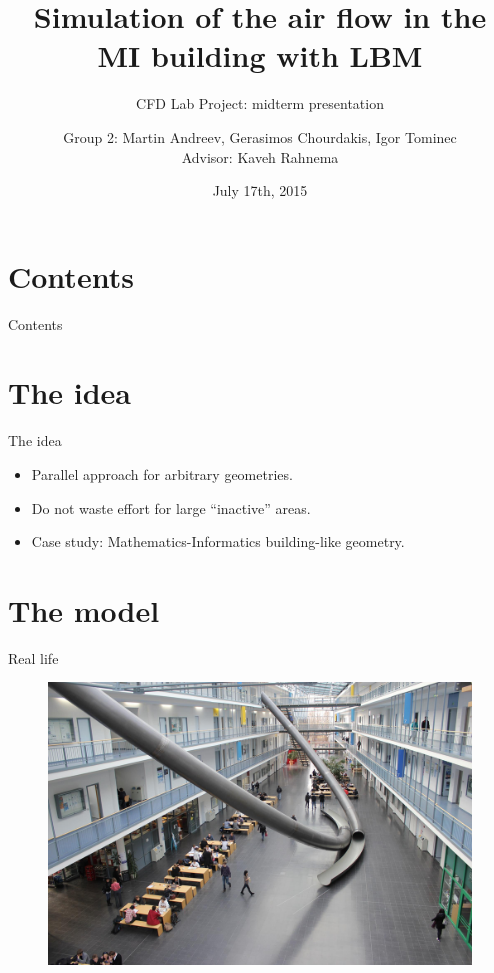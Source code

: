 \documentclass[9pt,pdftex]{beamer}
\title{Simulation of the air flow in the MI building with LBM}
\subtitle{CFD Lab Project: midterm presentation}
\author[Group 2]{Group 2: Martin Andreev, Gerasimos Chourdakis, Igor Tominec \\ Advisor: Kaveh Rahnema} %
\date{July 17th, 2015}
\institute{Technische Universität München}
\begin{document}
	\frame{\titlepage}

\section*{Contents}
\begin{frame}{Contents}
\tableofcontents
\end{frame}
	

\section{The idea}
\begin{frame}{The idea}
 \begin{itemize}
  \item Parallel approach for arbitrary geometries.
  \item Do not waste effort for large ``inactive'' areas.
  \item Case study: Mathematics-Informatics building-like geometry. 
 \end{itemize}
\end{frame}


\section{The model}

\begin{frame}{Real life}
\begin{figure}
\includegraphics[width=0.8\linewidth]{MI_slides}
\end{figure}
\end{frame}
\end{document}
